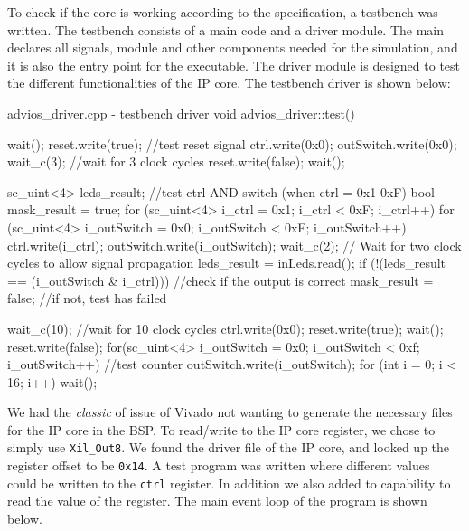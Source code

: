\documentclass[../main.tex]{subfiles}
\begin{document}
To check if the core is working according to the specification, a testbench was written. The testbench consists of a main code
and a driver module. 
The main declares all signals, module and other components needed for the simulation, and it is also the entry point for the executable. The driver module is designed to test
the different functionalities of the IP core. The testbench driver is shown below:
\begin{myminted}{advios_driver.cpp - testbench driver}
void advios_driver::test(){
	wait();
	reset.write(true); //test reset signal
	ctrl.write(0x0);
	outSwitch.write(0x0);
	wait_c(3); //wait for 3 clock cycles
	reset.write(false);
	wait();

	sc_uint<4> leds_result; //test ctrl AND switch (when ctrl = 0x1-0xF)
	bool mask_result = true;
	for (sc_uint<4> i_ctrl = 0x1; i_ctrl < 0xF; i_ctrl++) {
	    for (sc_uint<4> i_outSwitch = 0x0; i_outSwitch < 0xF; i_outSwitch++) {
	        ctrl.write(i_ctrl);
	        outSwitch.write(i_outSwitch);
	        wait_c(2);  // Wait for two clock cycles to allow signal propagation
	        leds_result = inLeds.read();
	        if (!(leds_result == (i_outSwitch & i_ctrl))) { //check if the output is correct
	            mask_result = false; //if not, test has failed
	        }
	    }
	}

	wait_c(10); //wait for 10 clock cycles
	ctrl.write(0x0);
	reset.write(true);
	wait();
	reset.write(false);
	for(sc_uint<4> i_outSwitch = 0x0; i_outSwitch < 0xf; i_outSwitch++){ //test counter
		outSwitch.write(i_outSwitch);
		for (int i = 0; i < 16; i++){
			wait();
		}
	}
}
\end{myminted}



\newpage

We had the \textit{classic} of issue of Vivado not wanting to generate the necessary files for the IP core in the BSP. To read/write to the IP core register, we chose to simply use \texttt{Xil\_Out8}. We found the driver file of the IP core, and looked up the register offset to be \texttt{0x14}. A test program was written where different values could be written to the \texttt{ctrl} register. In addition we also added to capability to read the value of the register. The main event loop of the program is shown below.
\end{document}
